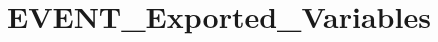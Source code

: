 \hypertarget{group___e_v_e_n_t___exported___variables}{}\section{E\+V\+E\+N\+T\+\_\+\+Exported\+\_\+\+Variables}
\label{group___e_v_e_n_t___exported___variables}
